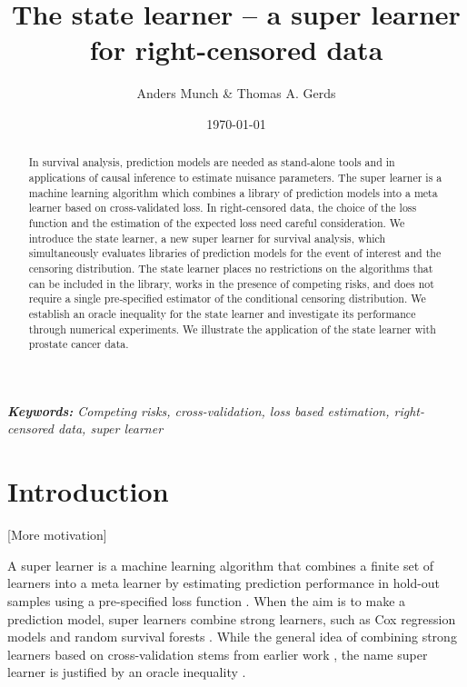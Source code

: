 \documentclass[a4paper,danish]{article}
\title{The state learner -- a super learner for right-censored
  data}
\author{Anders Munch \& Thomas A. Gerds}
\date{\today}
\theoremstyle{plain} %
\numberwithin{theorem}{section}
\theoremstyle{definition} %
\theoremstyle{remark}
\newcommand{\1}{\mathds{1}}
\begin{document}
\maketitle


\begin{abstract}
  In survival analysis, prediction models are needed as
  stand-alone tools and in applications of causal inference to
  estimate nuisance parameters. The super learner is a machine
  learning algorithm which combines a library of prediction
  models into a meta learner based on cross-validated loss. In
  right-censored data, the choice of the loss function and the
  estimation of the expected loss need careful consideration.
  We introduce the state learner, a new super learner for
  survival analysis, which simultaneously evaluates libraries
  of prediction models for the event of interest and the
  censoring distribution. The state learner places no
  restrictions on the algorithms that can be included in the
  library, works in the presence of competing risks, and does
  not require a single pre-specified estimator of the
  conditional censoring distribution. We establish an oracle
  inequality for the state learner and investigate its
  performance through numerical experiments. We illustrate the
  application of the state learner with prostate cancer data.
\end{abstract}

\textit{\textbf{Keywords:} Competing risks, cross-validation,
  loss based estimation, right-censored data, super learner}

\section{Introduction}
\label{sec:introduction}

[More motivation]


A super learner is a machine learning algorithm that combines
a finite set of learners into a meta learner by estimating
prediction performance in hold-out samples using a
pre-specified loss function \citep{van2007super}. When the aim
is to make a prediction model, super learners combine strong
learners, such as Cox regression models and random survival
forests \citep[][Section 8.4]{gerds2021medical}. While the
general idea of combining strong learners based on
cross-validation stems from earlier work
\citep{wolpert1992stacked,breiman1996stacked}, the name super
learner is justified by an oracle inequality
\citep{van2003unicv,vaart2006oracle}.
\end{document}
